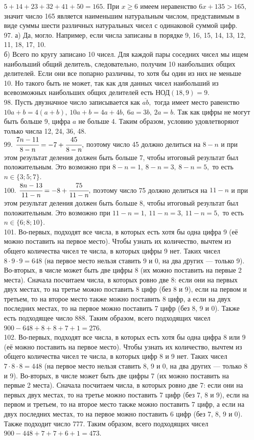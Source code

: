 \documentclass[12pt]{article}
\begin{document}
$5+14+23+32+41+50=165.$ При $x\geqslant6$ имеем неравенство $6x+135>165,$ значит число 165 является наименьшим натуральным числом, представимым в виде суммы шести различных натуральных чисел с одинаковой суммой цифр.\\
97. а) Да, могло. Например, если числа записаны в порядке 9, 16, 15, 14, 13, 12, 11, 18, 17, 10.\\
б) Всего по кругу записано 10 чисел. Для каждой пары соседних чисел мы ищем наибольший общий делитель, следовательно, получим 10 наибольших общих делителей. Если они все попарно различны, то хотя бы один из них не меньше 10. Но такого быть не может, так как для данных чисел наибольший из всевозможных наибольших общих делителей есть НОД$(18,9) = 9.$\\
98. Пусть двузначное число записывается как $\overline{ab},$ тогда имеет место равенство $10a+b=4(a+b),\ 10a+b=4a+4b,\ 6a=3b,\ 2a=b.$ Так как цифры не могут быть больше 9, цифра $a$ не больше 4. Таким образом, условию удовлетворяют только числа 12, 24, 36, 48.\\
99. $\cfrac{7n-11}{8-n}=-7+\cfrac{45}{8-n},$ поэтому число 45 должно делиться на $8-n$ и при этом результат деления должен быть больше 7, чтобы итоговый результат был положительным. Это возможно при $8-n=1,\ 8-n=3,\ 8-n=5,$ то есть $n\in\{3;5;7\}.$\\
100. $\cfrac{8n-13}{11-n}=-8+\cfrac{75}{11-n},$ поэтому число 75 должно делиться на $11-n$ и при этом результат деления должен быть больше 8, чтобы итоговый результат был положительным. Это возможно при $11-n=1,\ 11-n=3,\ 11-n=5,$ то есть $n\in\{6;8;10\}.$\\
101. Во-первых, подходят все числа, в которых есть хотя бы одна цифра 9 (её можно поставить на первое место). Чтобы узнать их количество, вычтем из общего количества чисел те числа, в которых цифры 9 нет. Таких чисел $8\cdot9\cdot9=648$ (на первое место нельзя ставить 9 и 0, на два других --- только 9). Во-вторых, в числе может быть две цифры 8 (их можно поставить на первые 2 места). Сначала посчитаем числа, в которых ровно две 8: если они на первых двух местах, то на третье можно поставить 8 цифр (без 8 и 9), если на первом и третьем, то на второе место также можно поставить 8 цифр, а если на двух последних местах, то на первое можно поставить 7 цифр (без 8, 9 и 0). Также есть подходящее число 888.
Таким образом, всего подходящих чисел $900-648+8+8+7+1=276.$\\
102. Во-первых, подходят все числа, в которых есть хотя бы одна цифра 8 или 9 (её можно поставить на первое место). Чтобы узнать их количество, вычтем из общего количества чисел те числа, в которых цифр 8 и 9 нет. Таких чисел $7\cdot8\cdot8=448$ (на первое место нельзя ставить 8, 9 и 0, на два других --- только 8 и 9). Во-вторых, в числе может быть две цифры 7 (их можно поставить на первые 2 места). Сначала посчитаем числа, в которых ровно две 7: если они на первых двух местах, то на третье можно поставить 7 цифр (без 7, 8 и 9), если на первом и третьем, то на второе место также можно поставить 7 цифр, а если на двух последних местах, то на первое можно поставить 6 цифр (без 7, 8, 9 и 0). Также подходит число 777.
Таким образом, всего подходящих чисел $900-448+7+7+6+1=473.$
\newpage
\end{document}
